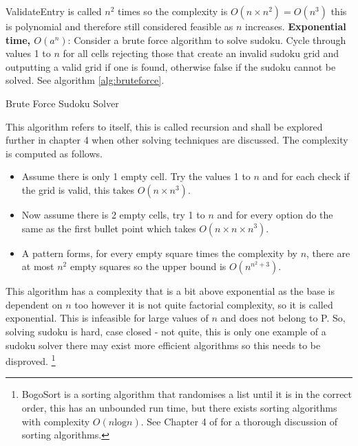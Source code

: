 \documentclass[a4paper,11pt]{report}
\begin{document}
ValidateEntry is called $n^2$ times so the complexity is $O(n\times n^2) = O(n^3)$ this is polynomial and therefore still considered feasible as $n$ increases. 
\textbf{Exponential time, $O(a^n)$}: Consider a brute force algorithm to solve sudoku. Cycle through values 1 to $n$ for all cells rejecting those that create an invalid sudoku grid and outputting a valid grid if one is found, otherwise false if the sudoku cannot be solved. See algorithm \ref{alg:bruteforce}.

\begin{algorithm}
\caption{Brute Force Sudoku Solver\label{alg:bruteforce}} 
\begin{algorithmic}
\Else
{}
\EndIf
\EndIf
{}
\EndIf
\EndFor
{}
\EndProcedure
\end{algorithmic}
\end{algorithm}

This algorithm refers to itself, this is called recursion and shall be explored further in chapter 4 when other solving techniques are discussed. The complexity is computed as follows. 
\begin{itemize}
\item Assume there is only 1 empty cell. Try the values 1 to $n$ and for each check if the grid is valid, this takes $O(n\times n^3)$.
\item Now assume there is 2 empty cells, try 1 to $n$ and for every option do the same as the first bullet point which takes $O(n\times n \times n^3)$.
\item A pattern forms, for every empty square times the complexity by $n$, there are at most $n^2$ empty squares so the upper bound is $O(n^{n^2+3})$.
\end{itemize}
This algorithm has a complexity that is a bit above exponential as the base is dependent on $n$ too however it is not quite factorial complexity, so it is called exponential. This is infeasible for large values of $n$ and does not belong to P. So, solving sudoku is hard, case closed - not quite, this is only one example of a sudoku solver there may exist more efficient algorithms so this needs to be disproved. \footnote{BogoSort is a sorting algorithm that randomises a list until it is in the correct order, this has an unbounded run time, but there exists sorting algorithms with complexity $O(n\text{log}n)$. See Chapter 4 of \cite{heineman2016algorithms} for a thorough discussion of sorting algorithms.} 
\end{document}
